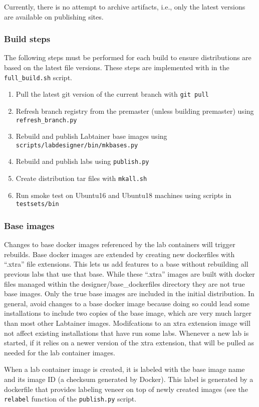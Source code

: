 \documentclass[12pt]{article}
\begin{document}
Currently, there is no attempt to archive artifacts, i.e., only the latest versions are available on publishing sites.

\subsubsection{Build steps}
The following steps must be performed for each build to ensure distributions are based on the latest file versions.
These steps are implemented with in the {\tt full\_build.sh} script.
\begin{enumerate}
\item Pull the latest git version of the current branch with {\tt git pull}
\item Refresh branch registry from the premaster (unless building premaster) using {\tt refresh\_branch.py}
\item Rebuild and publish Labtainer base images using {\tt scripts/labdesigner/bin/mkbases.py}
\item Rebuild and publish labs using {\tt publish.py}
\item Create distribution tar files with {\tt mkall.sh}
\item Run smoke test on Ubuntu16 and Ubuntu18 machines using scripts in {\tt testsets/bin}
\end{enumerate}

\subsubsection{Base images}
Changes to base docker images referenced by the lab containers will trigger rebuilds.  Base docker images are extended by creating
new dockerfiles with ``.xtra'' file extensions.  
This lets us add features to a base without rebuilding all previous labs that use that base.  
While these ``.xtra'' images are built with docker files managed within the
designer/base\_dockerfiles directory they are not true base images.
Only the true base images are included in the initial distribution.  
In general, avoid changes to a base docker image because doing so could lead some installations
to include two copies of the base image, which are very much larger than most other Labtainer images.  
Modifcations to an xtra extension image will not affect existing installations that have run
some labs.  Whenever a new lab is started, if it relies on a newer version of the xtra extension, that will be pulled as needed for the 
lab container images.

When a lab container image is created, it is labeled with the base image name and its image ID (a checksum generated by Docker).
This label is generated by a dockerfile that provides labeling veneer on top of newly created images (see the {\tt relabel} function
of the {\tt publish.py} script.
\end{document}
